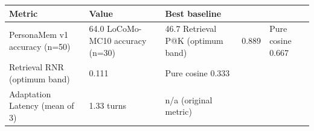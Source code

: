\begin{tabular}{lll}
\toprule
Metric & Value & Best baseline \\
\midrule
PersonaMem v1 accuracy (n=50) & 64.0%
LoCoMo-MC10 accuracy (n=30) & 46.7%
Retrieval P@K (optimum band) & 0.889 & Pure cosine 0.667 \\
Retrieval RNR (optimum band) & 0.111 & Pure cosine 0.333 \\
Adaptation Latency (mean of 3) & 1.33 turns & n/a (original metric) \\
\bottomrule
\end{tabular}
